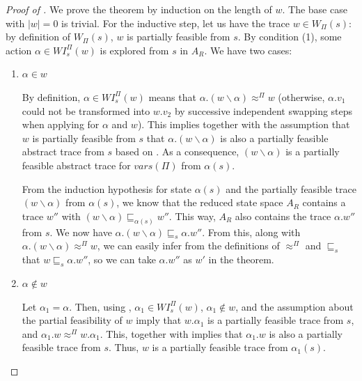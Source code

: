 \documentclass[numbook]{svjour3}
\begin{document}
\begin{proof}[Proof of ]	
	We prove the theorem by induction on the length of $w$. The base case with $|w| = 0$ is trivial. For the inductive step, let us have the trace $w \in W_\Pi(s)$: by definition of $W_\Pi(s)$, $w$ is partially feasible from $s$. By condition (1), some action $\alpha \in \mathit{WI}_s^\Pi(w)$ is explored from $s$ in $A_R$. We have two cases:
	
	\begin{enumerate}
		\item $\alpha \in w$
		
		By definition, $\alpha \in \mathit{WI}_s^\Pi(w)$ means that $\alpha.(w \backslash \alpha) \approx^\Pi w$ (otherwise, $\alpha.v_1$ could not be transformed into $w.v_2$ by successive independent swapping steps when applying  for $\alpha$ and $w$). This implies together with the assumption that $w$ is partially feasible from $s$ that $\alpha.(w \backslash \alpha)$ is also a partially feasible abstract trace from $s$ based on . As a consequence, $(w \backslash \alpha)$ is a partially feasible abstract trace for ${vars}(\Pi)$ from $\alpha(s)$.
		
		From the induction hypothesis for state $\alpha(s)$ and the partially feasible trace $(w \backslash \alpha)$ from $\alpha(s)$, we know that the reduced state space $A_R$ contains a trace $w''$ with $(w \backslash \alpha) \sqsubseteq_{\alpha(s)} w''$. This way, $A_R$ also contains the trace $\alpha.w''$ from $s$. We now have $\alpha.(w \backslash \alpha) \sqsubseteq_{s} \alpha.w''$. From this, along with $\alpha.(w \backslash \alpha) \approx^\Pi w$, we can easily infer from the definitions of $\approx^\Pi$ and $\sqsubseteq_{s}$ that $w \sqsubseteq_{s} \alpha.w''$, so we can take $\alpha.w''$ as $w'$ in the theorem.
		
		\item $\alpha \notin w$
		
		Let $\alpha_1 = \alpha$. Then, using , $\alpha_1 \in \mathit{WI}_s^\Pi(w)$, $\alpha_1 \notin w$, and the assumption about the partial feasibility of $w$ imply that $w.\alpha_1$ is a partially feasible trace from $s$, and $\alpha_1.w \approx^\Pi w.\alpha_1$. This, together with  implies that $\alpha_1.w$ is also a partially feasible trace from $s$. Thus, $w$ is a partially feasible trace from $\alpha_1(s)$.
		

\end{enumerate}
\end{proof}
\end{document}

